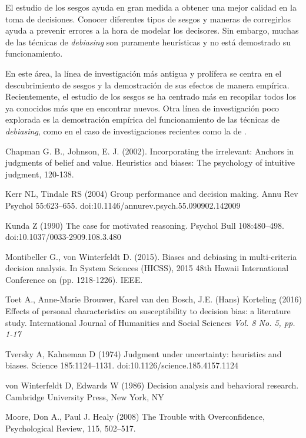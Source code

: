 \documentclass[a4paper,11pt]{article}
\begin{document}
El estudio de los sesgos ayuda en gran medida a obtener una mejor calidad en la toma de decisiones. Conocer diferentes tipos de sesgos y maneras de corregirlos ayuda a prevenir errores a la hora de modelar los decisores. Sin embargo, muchas de las técnicas de \textit{debiasing} son puramente heurísticas y no está demostrado su funcionamiento.

En este área, la línea de investigación más antigua y prolífera se centra en el descubrimiento de sesgos y la demostración de sus efectos de manera empírica. Recientemente, el estudio de los sesgos se ha centrado más en recopilar todos los ya conocidos más que en encontrar nuevos. Otra línea de investigación poco explorada es la demostración empírica del funcionamiento de las técnicas de \textit{debiasing}, como en el caso de investigaciones recientes como la de \cite{montibeller2015}.




\begin{thebibliography}{}

Chapman G. B., Johnson, E. J. (2002). Incorporating the irrelevant: Anchors in judgments of belief and value. Heuristics and biases: The psychology of intuitive judgment, 120-138.

Kerr NL, Tindale RS (2004) Group performance and decision making. Annu Rev Psychol 55:623–655. doi:10.1146/annurev.psych.55.090902.142009

Kunda Z (1990) The case for motivated reasoning. Psychol Bull 108:480–498. doi:10.1037/0033-2909.108.3.480

Montibeller G., von Winterfeldt D. (2015). Biases and debiasing in multi-criteria decision analysis. In System Sciences (HICSS), 2015 48th Hawaii International Conference on (pp. 1218-1226). IEEE.

Toet A., Anne-Marie Brouwer, Karel van den Bosch, J.E. (Hans) Korteling (2016) Effects of personal characteristics on susceptibility to decision bias: a literature study. International Journal of Humanities and Social Sciences \textit{Vol. 8 No. 5, pp. 1-17}

Tversky A, Kahneman D (1974) Judgment under uncertainty: heuristics and biases. Science
185:1124–1131. doi:10.1126/science.185.4157.1124

von Winterfeldt D, Edwards W (1986) Decision analysis and behavioral research. Cambridge University Press, New York, NY

Moore, Don A., Paul J. Healy (2008) The Trouble with Overconfidence, Psychological Review, 115, 502–517.

\end{thebibliography}
\end{document}
